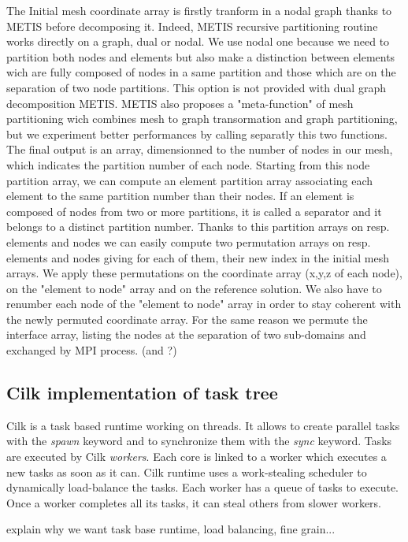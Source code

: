 \documentclass{IOS-Book-Article}
\begin{document}
The Initial mesh coordinate array is firstly tranform in a nodal graph thanks to METIS before decomposing it. Indeed, METIS recursive partitioning routine works directly
on a graph, dual or nodal. We use nodal one because we need to partition both nodes and elements but also make a distinction between elements wich are fully composed of
nodes in a same partition and those which are on the separation of two node partitions. This option is not provided with dual graph decomposition METIS.
METIS also proposes a "meta-function" of mesh partitioning wich combines mesh to graph transormation and graph partitioning, but we experiment better performances by
calling separatly this two functions.
The final output is an array, dimensionned to the number of nodes in our mesh, which indicates the partition number of each node.
Starting from this node partition array, we can compute an element partition array associating each element to the same partition number than their nodes.
If an element is composed of nodes from two or more partitions, it is called a separator and it belongs to a distinct partition number.
Thanks to this partition arrays on resp. elements and nodes we can easily compute two permutation arrays on resp. elements and nodes giving for each of them, their new
index in the initial mesh arrays. We apply these permutations on the coordinate array (x,y,z of each node), on the "element to node" array and on the reference solution.
We also have to renumber each node of the "element to node" array in order to stay coherent with the newly permuted coordinate array. For the same reason we permute the
interface array, listing the nodes at the separation of two sub-domains and exchanged by MPI process. (and ?)

\subsection{Cilk implementation of task tree}

Cilk is a task based runtime working on threads. It allows to create parallel tasks with the \emph{spawn} keyword and to synchronize them with the \emph{sync} keyword.
Tasks are executed by Cilk \emph{workers}. Each core is linked to a worker which executes a new tasks as soon as it can.
Cilk runtime uses a work-stealing scheduler to dynamically load-balance the tasks. Each worker has a queue of tasks to execute.
Once a worker completes all its tasks, it can steal others from slower workers.

explain why we want task base runtime, load balancing, fine grain...
\end{document}
